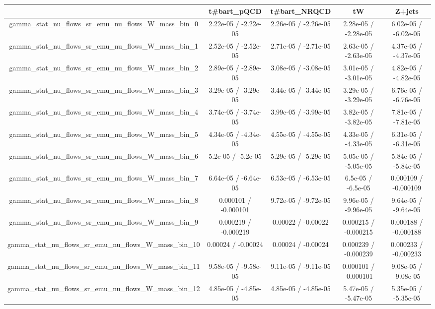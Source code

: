 \documentclass[10pt]{article}
\begin{document}
\begin{table}[htbp]
\begin{center}
\begin{tabular}{|c|c|c|c|c|}
\hline 
      & t#bar{t}_{pQCD}      & t#bar{t}_{NRQCD}      & tW      & Z+jets \\ 
\hline 
  gamma_stat_nu_flows_sr_emu_nu_flows_W_mass_bin_0 & 2.22e-05 / -2.22e-05 & 2.26e-05 / -2.26e-05 & 2.28e-05 / -2.28e-05 & 6.02e-05 / -6.02e-05 \\ 
  gamma_stat_nu_flows_sr_emu_nu_flows_W_mass_bin_1 & 2.52e-05 / -2.52e-05 & 2.71e-05 / -2.71e-05 & 2.63e-05 / -2.63e-05 & 4.37e-05 / -4.37e-05 \\ 
  gamma_stat_nu_flows_sr_emu_nu_flows_W_mass_bin_2 & 2.89e-05 / -2.89e-05 & 3.08e-05 / -3.08e-05 & 3.01e-05 / -3.01e-05 & 4.82e-05 / -4.82e-05 \\ 
  gamma_stat_nu_flows_sr_emu_nu_flows_W_mass_bin_3 & 3.29e-05 / -3.29e-05 & 3.44e-05 / -3.44e-05 & 3.29e-05 / -3.29e-05 & 6.76e-05 / -6.76e-05 \\ 
  gamma_stat_nu_flows_sr_emu_nu_flows_W_mass_bin_4 & 3.74e-05 / -3.74e-05 & 3.99e-05 / -3.99e-05 & 3.82e-05 / -3.82e-05 & 7.81e-05 / -7.81e-05 \\ 
  gamma_stat_nu_flows_sr_emu_nu_flows_W_mass_bin_5 & 4.34e-05 / -4.34e-05 & 4.55e-05 / -4.55e-05 & 4.33e-05 / -4.33e-05 & 6.31e-05 / -6.31e-05 \\ 
  gamma_stat_nu_flows_sr_emu_nu_flows_W_mass_bin_6 & 5.2e-05 / -5.2e-05 & 5.29e-05 / -5.29e-05 & 5.05e-05 / -5.05e-05 & 5.84e-05 / -5.84e-05 \\ 
  gamma_stat_nu_flows_sr_emu_nu_flows_W_mass_bin_7 & 6.64e-05 / -6.64e-05 & 6.53e-05 / -6.53e-05 & 6.5e-05 / -6.5e-05 & 0.000109 / -0.000109 \\ 
  gamma_stat_nu_flows_sr_emu_nu_flows_W_mass_bin_8 & 0.000101 / -0.000101 & 9.72e-05 / -9.72e-05 & 9.96e-05 / -9.96e-05 & 9.64e-05 / -9.64e-05 \\ 
  gamma_stat_nu_flows_sr_emu_nu_flows_W_mass_bin_9 & 0.000219 / -0.000219 & 0.00022 / -0.00022 & 0.000215 / -0.000215 & 0.000188 / -0.000188 \\ 
  gamma_stat_nu_flows_sr_emu_nu_flows_W_mass_bin_10 & 0.00024 / -0.00024 & 0.00024 / -0.00024 & 0.000239 / -0.000239 & 0.000233 / -0.000233 \\ 
  gamma_stat_nu_flows_sr_emu_nu_flows_W_mass_bin_11 & 9.58e-05 / -9.58e-05 & 9.11e-05 / -9.11e-05 & 0.000101 / -0.000101 & 9.08e-05 / -9.08e-05 \\ 
  gamma_stat_nu_flows_sr_emu_nu_flows_W_mass_bin_12 & 4.85e-05 / -4.85e-05 & 4.85e-05 / -4.85e-05 & 5.47e-05 / -5.47e-05 & 5.35e-05 / -5.35e-05 \\ 

\end{tabular}
\end{center}
\end{table}
\end{document}
